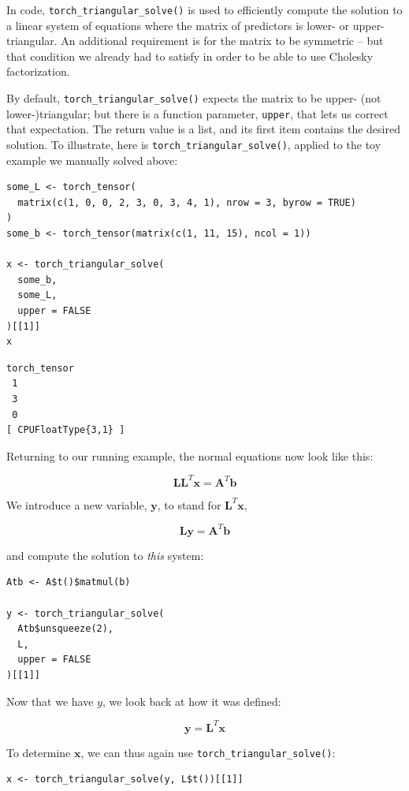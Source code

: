 \documentclass[
  letterpaper,
]{krantz}
\begin{document}
In code, \texttt{torch\_triangular\_solve()} is used to efficiently
compute the solution to a linear system of equations where the matrix of
predictors is lower- or upper-triangular. An additional requirement is
for the matrix to be symmetric -- but that condition we already had to
satisfy in order to be able to use Cholesky factorization.

By default, \texttt{torch\_triangular\_solve()} expects the matrix to be
upper- (not lower-)triangular; but there is a function parameter,
\texttt{upper}, that lets us correct that expectation. The return value
is a list, and its first item contains the desired solution. To
illustrate, here is \texttt{torch\_triangular\_solve()}, applied to the
toy example we manually solved above:

\begin{verbatim}
some_L <- torch_tensor(
  matrix(c(1, 0, 0, 2, 3, 0, 3, 4, 1), nrow = 3, byrow = TRUE)
)
some_b <- torch_tensor(matrix(c(1, 11, 15), ncol = 1))

x <- torch_triangular_solve(
  some_b,
  some_L,
  upper = FALSE
)[[1]]
x
\end{verbatim}

\begin{verbatim}
torch_tensor
 1
 3
 0
[ CPUFloatType{3,1} ]
\end{verbatim}

Returning to our running example, the normal equations now look like
this:

\[
\mathbf{L}\mathbf{L}^T \mathbf{x} = \mathbf{A}^T \mathbf{b}
\]

We introduce a new variable, \(\mathbf{y}\), to stand for
\(\mathbf{L}^T \mathbf{x}\),

\[
\mathbf{L}\mathbf{y} = \mathbf{A}^T \mathbf{b}
\]

and compute the solution to \emph{this} system:

\begin{verbatim}
Atb <- A$t()$matmul(b)

y <- torch_triangular_solve(
  Atb$unsqueeze(2),
  L,
  upper = FALSE
)[[1]]
\end{verbatim}

Now that we have \(y\), we look back at how it was defined:

\[
\mathbf{y} = \mathbf{L}^T \mathbf{x}
\]

To determine \(\mathbf{x}\), we can thus again use
\texttt{torch\_triangular\_solve()}:

\begin{verbatim}
x <- torch_triangular_solve(y, L$t())[[1]]
\end{verbatim}
\end{document}
